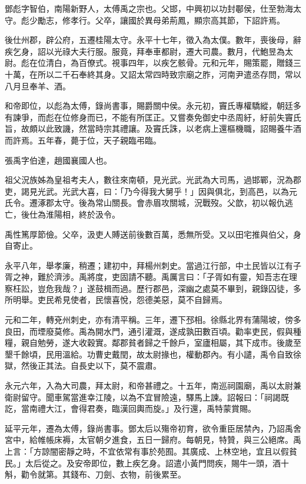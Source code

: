 
\begin{pinyinscope}
鄧彪字智伯，南陽新野人，太傅禹之宗也。父邯，中興初以功封鄳侯，仕至勃海太守。彪少勵志，修孝行。父卒，讓國於異母弟荊鳳，顯宗高其節，下詔許焉。

後仕州郡，辟公府，五遷桂陽太守。永平十七年，徵入為太僕。數年，喪後母，辭疾乞身，詔以光祿大夫行服。服竟，拜奉車都尉，遷大司農。數月，代鮑昱為太尉。彪在位清白，為百僚式。視事四年，以疾乞骸骨。元和元年，賜策罷，贈錢三十萬，在所以二千石奉終其身。又詔太常四時致宗廟之胙，河南尹遣丞存問，常以八月旦奉羊、酒。

和帝即位，以彪為太傅，錄尚書事，賜爵關中侯。永元初，竇氏專權驕縱，朝廷多有諫爭，而彪在位修身而已，不能有所匡正。又嘗奏免御史中丞周紆，紆前失竇氏旨，故頗以此致譏，然當時宗其禮讓。及竇氏誅，以老病上還樞機職，詔賜養牛酒而許焉。五年春，薨于位，天子親臨弔臨。

張禹字伯達，趙國襄國人也。

祖父況族姊為皇祖考夫人，數往來南頓，見光武。光武為大司馬，過邯鄲，況為郡吏，謁見光武。光武大喜，曰：「乃今得我大舅乎！」因與俱北，到高邑，以為元氏令。遷涿郡太守。後為常山關長。會赤眉攻關城，況戰歿。父歆，初以報仇逃亡，後仕為淮陽相，終於汲令。

禹性篤厚節儉。父卒，汲吏人賻送前後數百萬，悉無所受。又以田宅推與伯父，身自寄止。

永平八年，舉孝廉，稍遷；建初中，拜楊州刺史。當過江行部，中土民皆以江有子胥之神，難於濟涉。禹將度，吏固請不聽。禹厲言曰：「子胥如有靈，知吾志在理察枉訟，豈危我哉？」遂鼓楫而過。歷行郡邑，深幽之處莫不畢到，親錄囚徒，多所明舉。吏民希見使者，民懷喜悅，怨德美惡，莫不自歸焉。

元和二年，轉兗州刺史，亦有清平稱。三年，遷下邳相。徐縣北界有蒲陽坡，傍多良田，而堙廢莫修。禹為開水門，通引灌溉，遂成孰田數百頃。勸率吏民，假與種糧，親自勉勞，遂大收穀實。鄰郡貧者歸之千餘戶，室廬相屬，其下成巿。後歲至墾千餘頃，民用溫給。功曹史戴閏，故太尉掾也，權動郡內。有小譴，禹令自致徐獄，然後正其法。自長史以下，莫不震肅。

永元六年，入為大司農，拜太尉，和帝甚禮之。十五年，南巡祠園廟，禹以太尉兼衛尉留守。聞車駕當進幸江陵，以為不宜冒險遠，驛馬上諫。詔報曰：「祠謁既訖，當南禮大江，會得君奏，臨漢回輿而旋。」及行還，禹特蒙賞賜。

延平元年，遷為太傅，錄尚書事。鄧太后以殤帝初育，欲令重臣居禁內，乃詔禹舍宮中，給帷帳床褥，太官朝夕進食，五日一歸府。每朝見，特贊，與三公絕席。禹上言：「方諒闇密靜之時，不宜依常有事於苑囿。其廣成、上林空地，宜且以假貧民。」太后從之。及安帝即位，數上疾乞身。詔遣小黃門問疾，賜牛一頭，酒十斛，勸令就第。其錢布、刀劍、衣物，前後累至。


\end{pinyinscope}
